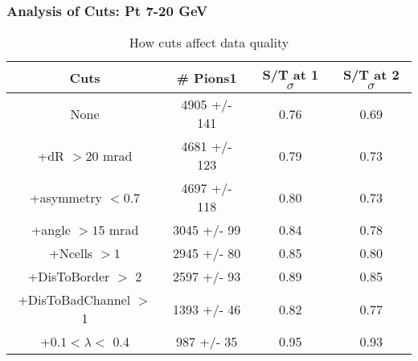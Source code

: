 \frame
{
\frametitle{Analysis of Cuts: Pt 7-20 GeV}
\begin{table}
\caption{How cuts affect data quality}
\centering
\begin{tabular}{c c c c}
\hline\hline
Cuts & \# Pions1 & S/T at 1 $\sigma$ & S/T at 2 $\sigma$ \\ [0.5ex]
\hline
None & 4905 +/-  141 & 0.76 & 0.69 \\ %
+dR $> 20$ mrad & 4681 +/-  123 & 0.79 & 0.73 \\ %
+asymmetry $< 0.7$ & 4697 +/-  118 & 0.80 & 0.73 \\ %
+angle $> 15$ mrad & 3045 +/-   99 & 0.84 & 0.78 \\ %
+Ncells $> 1$& 2945 +/-   80 & 0.85 & 0.80 \\ %
+DisToBorder $>$ 2 & 2597 +/-   93 & 0.89 & 0.85 \\ %
+DisToBadChannel $>$ 1& 1393 +/-   46 & 0.82 & 0.77 \\ %
+$0.1 < \lambda <$ 0.4 &  987 +/-   35 & 0.95 & 0.93 \\ %
[1ex]
\hline
\end{tabular}
\label{table:nonlin}
\end{table}
}
